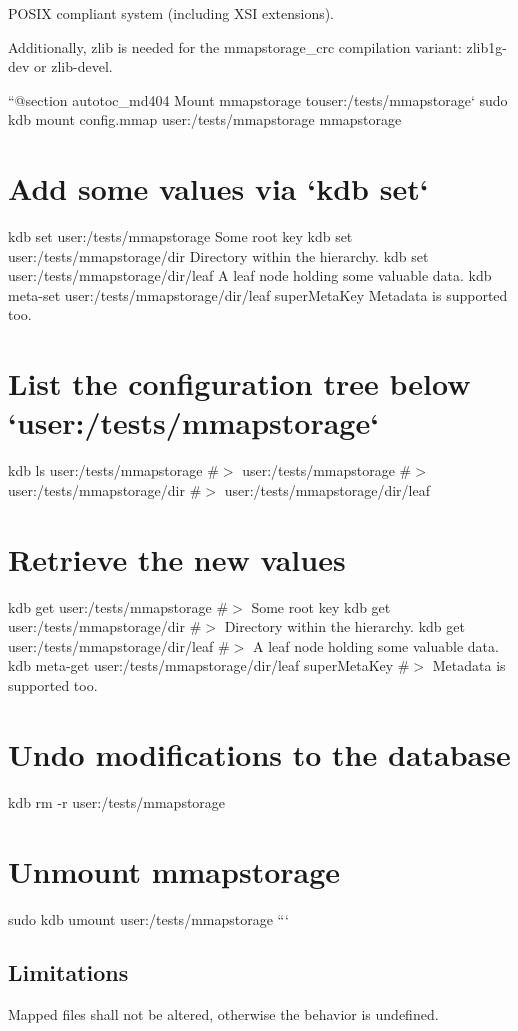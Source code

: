 P\+O\+S\+IX compliant system (including X\+SI extensions).

Additionally, zlib is needed for the {\ttfamily mmapstorage\+\_\+crc} compilation variant\+: {\ttfamily zlib1g-\/dev} or {\ttfamily zlib-\/devel}.

``{\ttfamily  @section autotoc\+\_\+md404 Mount mmapstorage to}user\+:/tests/mmapstorage` sudo kdb mount config.\+mmap user\+:/tests/mmapstorage mmapstorage\hypertarget{autotoc_md398_autotoc_md405}{}\section{Add some values via `kdb set`}\label{autotoc_md398_autotoc_md405}
kdb set user\+:/tests/mmapstorage \textquotesingle{}Some root key\textquotesingle{} kdb set user\+:/tests/mmapstorage/dir \textquotesingle{}Directory within the hierarchy.\textquotesingle{} kdb set user\+:/tests/mmapstorage/dir/leaf \textquotesingle{}A leaf node holding some valuable data.\textquotesingle{} kdb meta-\/set user\+:/tests/mmapstorage/dir/leaf super\+Meta\+Key \textquotesingle{}Metadata is supported too.\textquotesingle{}\hypertarget{autotoc_md398_autotoc_md406}{}\section{List the configuration tree below `user\+:/tests/mmapstorage`}\label{autotoc_md398_autotoc_md406}
kdb ls user\+:/tests/mmapstorage \#$>$ user\+:/tests/mmapstorage \#$>$ user\+:/tests/mmapstorage/dir \#$>$ user\+:/tests/mmapstorage/dir/leaf\hypertarget{autotoc_md398_autotoc_md407}{}\section{Retrieve the new values}\label{autotoc_md398_autotoc_md407}
kdb get user\+:/tests/mmapstorage \#$>$ Some root key kdb get user\+:/tests/mmapstorage/dir \#$>$ Directory within the hierarchy. kdb get user\+:/tests/mmapstorage/dir/leaf \#$>$ A leaf node holding some valuable data. kdb meta-\/get user\+:/tests/mmapstorage/dir/leaf super\+Meta\+Key \#$>$ Metadata is supported too.\hypertarget{autotoc_md398_autotoc_md408}{}\section{Undo modifications to the database}\label{autotoc_md398_autotoc_md408}
kdb rm -\/r user\+:/tests/mmapstorage\hypertarget{autotoc_md398_autotoc_md409}{}\section{Unmount mmapstorage}\label{autotoc_md398_autotoc_md409}
sudo kdb umount user\+:/tests/mmapstorage ```\hypertarget{autotoc_md398_autotoc_md410}{}\subsection{Limitations}\label{autotoc_md398_autotoc_md410}
Mapped files shall not be altered, otherwise the behavior is undefined.

